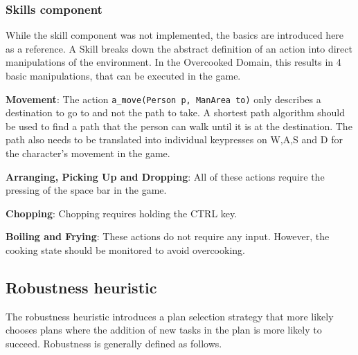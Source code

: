 \subsubsection{Skills component}

While the skill component was not implemented, the basics are introduced here as a reference.
A Skill breaks down the abstract definition of an action into direct manipulations of the environment.
In the Overcooked Domain, this results in 4 basic manipulations, that can be executed in the game.

\textbf{Movement}: The action \verb|a_move(Person p, ManArea to)| only describes a destination to go to and not the path to take. 
A shortest path algorithm should be used to find a path that the person can walk until it is at the destination. 
The path also needs to be translated into individual keypresses on W,A,S and D for the character's movement in the game.

\textbf{Arranging, Picking Up and Dropping}: All of these actions require the pressing of the space bar in the game.

\textbf{Chopping}: Chopping requires holding the CTRL key.

\textbf{Boiling and Frying}: These actions do not require any input. 
However, the cooking state should be monitored to avoid overcooking.





\subsection{Robustness heuristic}
\label{sec:approach-robustness}

The robustness heuristic introduces a plan selection strategy that more likely chooses plans where the addition of new tasks in the plan is more likely to succeed.
Robustness is generally defined as follows.

